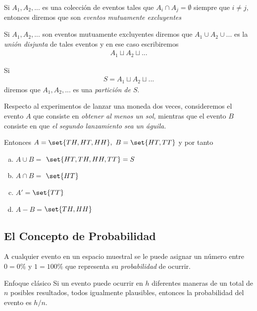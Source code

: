  \begin{defn}
  Si $A_{1},A_{2},...$ es una colección de eventos tales que $A_{i}\cap A_{j}=\emptyset$ siempre que $i\neq j,$ entonces diremos que son \emph{eventos mutuamente excluyentes}
 \end{defn}

 


 \begin{defn}
  Si $A_{1}, A_{2}, ...$ son eventos mutuamente excluyentes diremos que $A_{1} \cup A_{2} \cup ... $ es la \emph{unión disjunta} de tales eventos y en ese caso escribiremos
  \begin{align*}
A_{1}\sqcup A_{2} \sqcup ...
\end{align*}
 \end{defn}


Si \begin{align*}
S=A_{1}\sqcup A_{2} \sqcup ...
\end{align*}
diremos que $A_{1},A_{2},...$ es una \emph{partición de $S.$}


 \begin{ejemplo}
  \label{exmp:0.1.9}
  Respecto al experimentos de lanzar una moneda dos veces, consideremos el evento $A$ que consiste en \emph{obtener al menos un sol,}  mientras que el evento $B$ consiste en que \emph{el segundo lanzamiento sea un águila.}

  Entonces $A=\set{TH,HT,HH},$ $B=\set{HT,TT}$ y por tanto 
  \begin{enumerate}[(a)]
   \item $A\cup B =$ $\set{HT,TH,HH,TT}= S$ 
	\item $A\cap B =$ $\set{HT}$ 
	\item $A'=$$\set{TT}$
	\item $A-B=$$\set{TH,HH}$
  \end{enumerate}

 \end{ejemplo}


\subsection{El Concepto de Probabilidad}
{}
A cualquier evento en un espacio muestral se le puede asignar un número entre $0=0\%$ y $1=100\%$ que representa su \emph{probabilidad} de ocurrir.

{Enfoque clásico}
Si un evento puede ocurrir en $h$ diferentes maneras de un total de $n$ posibles resultados, todos igualmente plausibles, entonces la probabilidad del evento es $h/n.$


